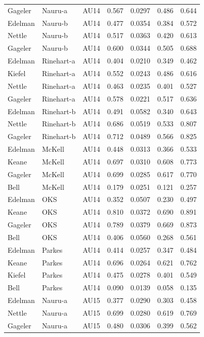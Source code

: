 \documentclass{monashthesis}
\begin{document}
\begin{center}
\begin{longtable}{lllllll}
Gageler & Nauru-a & AU14 & 0.567 & 0.0297 & 0.486 & 0.644 \\
Edelman & Nauru-b & AU14 & 0.477 & 0.0354 & 0.384 & 0.572 \\
Nettle & Nauru-b & AU14 & 0.517 & 0.0363 & 0.420 & 0.613 \\
Gageler & Nauru-b & AU14 & 0.600 & 0.0344 & 0.505 & 0.688 \\
Edelman & Rinehart-a & AU14 & 0.404 & 0.0210 & 0.349 & 0.462 \\
Kiefel & Rinehart-a & AU14 & 0.552 & 0.0243 & 0.486 & 0.616 \\
Nettle & Rinehart-a & AU14 & 0.463 & 0.0235 & 0.401 & 0.527 \\
Gageler & Rinehart-a & AU14 & 0.578 & 0.0221 & 0.517 & 0.636 \\
Edelman & Rinehart-b & AU14 & 0.491 & 0.0582 & 0.340 & 0.643 \\
Nettle & Rinehart-b & AU14 & 0.686 & 0.0519 & 0.533 & 0.807 \\
Gageler & Rinehart-b & AU14 & 0.712 & 0.0489 & 0.566 & 0.825 \\
Edelman & McKell & AU14 & 0.448 & 0.0313 & 0.366 & 0.533 \\
Keane & McKell & AU14 & 0.697 & 0.0310 & 0.608 & 0.773 \\
Gageler & McKell & AU14 & 0.699 & 0.0285 & 0.617 & 0.770 \\
Bell & McKell & AU14 & 0.179 & 0.0251 & 0.121 & 0.257 \\
Edelman & OKS & AU14 & 0.352 & 0.0507 & 0.230 & 0.497 \\
Keane & OKS & AU14 & 0.810 & 0.0372 & 0.690 & 0.891 \\
Gageler & OKS & AU14 & 0.789 & 0.0379 & 0.669 & 0.873 \\
Bell & OKS & AU14 & 0.406 & 0.0560 & 0.268 & 0.561 \\
Edelman & Parkes & AU14 & 0.414 & 0.0257 & 0.347 & 0.484 \\
Keane & Parkes & AU14 & 0.696 & 0.0264 & 0.621 & 0.762 \\
Kiefel & Parkes & AU14 & 0.475 & 0.0278 & 0.401 & 0.549 \\
Bell & Parkes & AU14 & 0.090 & 0.0139 & 0.058 & 0.135 \\
Edelman & Nauru-a & AU15 & 0.377 & 0.0290 & 0.303 & 0.458 \\
Nettle & Nauru-a & AU15 & 0.699 & 0.0280 & 0.619 & 0.769 \\
Gageler & Nauru-a & AU15 & 0.480 & 0.0306 & 0.399 & 0.562 \\

\end{longtable}
\end{center}
\end{document}
